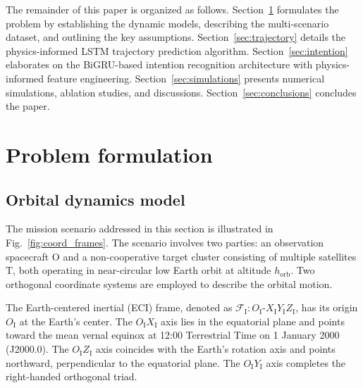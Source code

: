 \documentclass[a4paper,fleqn]{cas-dc}
\begin{document}
The remainder of this paper is organized as follows. Section~\ref{sec:problem} formulates the problem by establishing the dynamic models, describing the multi-scenario dataset, and outlining the key assumptions. Section~\ref{sec:trajectory} details the physics-informed LSTM trajectory prediction algorithm. Section~\ref{sec:intention} elaborates on the BiGRU-based intention recognition architecture with physics-informed feature engineering. Section~\ref{sec:simulations} presents numerical simulations, ablation studies, and discussions. Section~\ref{sec:conclusions} concludes the paper.

\section{Problem formulation}\label{sec:problem}

\subsection{Orbital dynamics model}

The mission scenario addressed in this section is illustrated in Fig.~\ref{fig:coord_frames}. The scenario involves two parties: an observation spacecraft $\mathrm{O}$ and a non-cooperative target cluster consisting of multiple satellites $\mathrm{T}$, both operating in near-circular low Earth orbit at altitude $h_{\text{orb}}$. Two orthogonal coordinate systems are employed to describe the orbital motion.

The Earth-centered inertial (ECI) frame, denoted as $\mathcal{F}_{\mathrm{I}}: O_{\mathrm{I}}\text{-}X_{\mathrm{I}}Y_{\mathrm{I}}Z_{\mathrm{I}}$, has its origin $O_{\mathrm{I}}$ at the Earth's center. The $O_{\mathrm{I}}X_{\mathrm{I}}$ axis lies in the equatorial plane and points toward the mean vernal equinox at 12:00 Terrestrial Time on 1 January 2000 (J2000.0). The $O_{\mathrm{I}}Z_{\mathrm{I}}$ axis coincides with the Earth's rotation axis and points northward, perpendicular to the equatorial plane. The $O_{\mathrm{I}}Y_{\mathrm{I}}$ axis completes the right-handed orthogonal triad.
\end{document}
